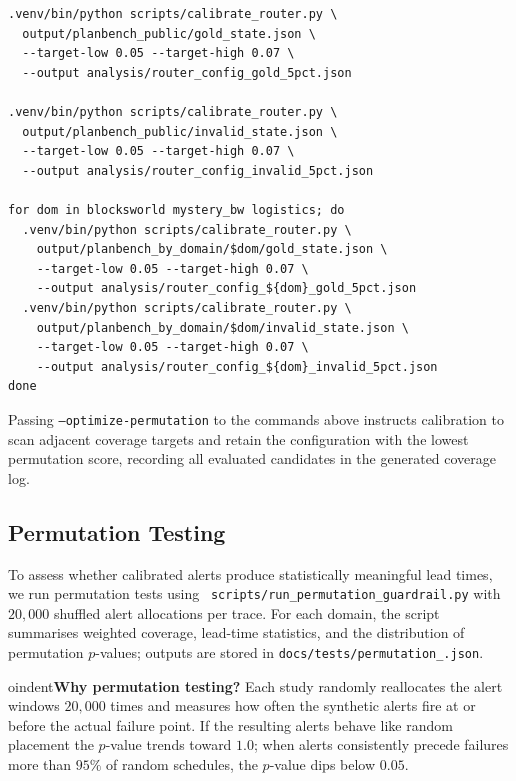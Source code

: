 \documentclass[11pt]{article}
\begin{document}
\begin{lstlisting}[style=stm, caption={Router calibration commands.}, label={lst:calibration}]
.venv/bin/python scripts/calibrate_router.py \
  output/planbench_public/gold_state.json \
  --target-low 0.05 --target-high 0.07 \
  --output analysis/router_config_gold_5pct.json

.venv/bin/python scripts/calibrate_router.py \
  output/planbench_public/invalid_state.json \
  --target-low 0.05 --target-high 0.07 \
  --output analysis/router_config_invalid_5pct.json

for dom in blocksworld mystery_bw logistics; do
  .venv/bin/python scripts/calibrate_router.py \
    output/planbench_by_domain/$dom/gold_state.json \
    --target-low 0.05 --target-high 0.07 \
    --output analysis/router_config_${dom}_gold_5pct.json
  .venv/bin/python scripts/calibrate_router.py \
    output/planbench_by_domain/$dom/invalid_state.json \
    --target-low 0.05 --target-high 0.07 \
    --output analysis/router_config_${dom}_invalid_5pct.json
done
\end{lstlisting}

Passing \texttt{--optimize-permutation} to the commands above instructs
calibration to scan adjacent coverage targets and retain the configuration with
the lowest permutation score, recording all evaluated candidates in the
generated coverage log.

\subsection{Permutation Testing}
\label{subsec:permutation-testing}
To assess whether calibrated alerts produce statistically meaningful lead times,
we run permutation tests using \
\texttt{scripts/run\_permutation\_guardrail.py} with $20{,}000$ shuffled alert
allocations per trace. For each domain, the script summarises weighted coverage,
lead-time statistics, and the distribution of permutation $p$-values; outputs are
stored in \texttt{docs/tests/permutation\_\*.json}.


oindent\textbf{Why permutation testing?} Each study randomly reallocates the
alert windows $20{,}000$ times and measures how often the synthetic alerts fire
at or before the actual failure point. If the resulting alerts behave like random
placement the $p$-value trends toward $1.0$; when alerts consistently precede
failures more than $95\%$ of random schedules, the $p$-value dips below $0.05$.
\end{document}
